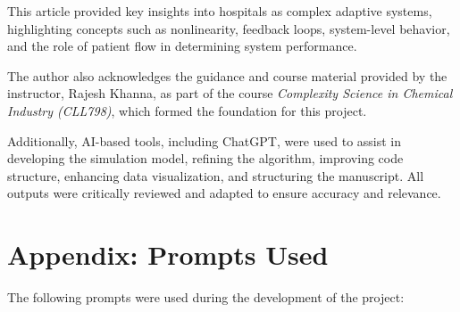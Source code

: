 \documentclass[11pt]{article}
\begin{document}
This article provided key insights into hospitals as complex adaptive systems, highlighting concepts such as nonlinearity, feedback loops, system-level behavior, and the role of patient flow in determining system performance.

The author also acknowledges the guidance and course material provided by the instructor, Rajesh Khanna, as part of the course \textit{Complexity Science in Chemical Industry (CLL798)}, which formed the foundation for this project.

Additionally, AI-based tools, including ChatGPT, were used to assist in developing the simulation model, refining the algorithm, improving code structure, enhancing data visualization, and structuring the manuscript. All outputs were critically reviewed and adapted to ensure accuracy and relevance.

\vspace{0.5cm}

\section*{Appendix: Prompts Used}

The following prompts were used during the development of the project:
\end{document}
